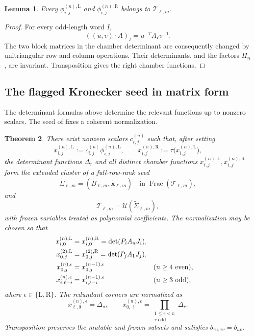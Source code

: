 \documentclass[11pt]{amsart}
\newtheorem{theorem}{Theorem}[section]
\newtheorem{lemma}[theorem]{Lemma}
\theoremstyle{definition}
\theoremstyle{remark}
\newcommand{\cT}{\mathcal T}
\newcommand{\Frac}{\operatorname{Frac}}
\begin{document}
\begin{lemma}
\label{lem:chamber-invariance}
Every $\phi_{i,j}^{(n),\mathrm L}$ and
$\phi_{i,j}^{(n),\mathrm R}$ belongs to $\cT_{\ell,m}$.
\end{lemma}

\begin{proof}
For every odd-length word $I$,
\[ ((u,v)\cdot A)_I=u^{-T}A_Iv^{-1}. \]
The two block matrices in the chamber determinant are consequently changed
by unitriangular row and column operations.  Their determinants, and the
factors $\Pi_n$, are invariant.  Transposition gives the right chamber
functions.
\end{proof}

\subsection{The flagged Kronecker seed in matrix form}
\label{subsec:flagged-matrix-form}

The determinant formulas above determine the relevant functions up to
nonzero scalars.  The seed of \cite{FeiKroneckerII} fixes a coherent
normalization.

\begin{theorem}\label{thm:flagged-matrix-form}
There exist nonzero scalars $c_{i,j}^{(n)}$ such that, after setting
\[ x_{i,j}^{(n),\mathrm L}:= c_{i,j}^{(n)}\phi_{i,j}^{(n),\mathrm L}, \qquad x_{i,j}^{(n),\mathrm R}:=\tau \bigl(x_{i,j}^{(n),\mathrm L}\bigr), \]
the determinant functions $\Delta_r$ and all distinct chamber functions
$x_{i,j}^{(n),\mathrm L},x_{i,j}^{(n),\mathrm R}$ form the extended cluster
of a full-row-rank seed
\[ \widetilde\Sigma_{\ell,m} =(\widetilde B_{\ell,m},\widetilde{\mathbf x}_{\ell,m}) \quad\text{in }\Frac(\cT_{\ell,m}), \]
and
\begin{equation}
 \cT_{\ell,m}=\mathcal U(\widetilde\Sigma_{\ell,m}),
 \label{eq:flagged-UCA}
\end{equation}
with frozen variables treated as polynomial coefficients.  The normalization
may be chosen so that
\begin{align}
 x_{i,0}^{(n),\mathrm L}&=x_{i,0}^{(n),\mathrm R}
 =\det(P_iA_nJ_i),
 \notag\\
 x_{0,j}^{(2),\mathrm L}&=x_{0,j}^{(2),\mathrm R}
 =\det(P_jA_1J_j),
 \notag\\
 x_{0,j}^{(n),\epsilon}&=x_{0,j}^{(n-1),\epsilon}
 &&(n\ge4\text{ even}),
 \label{eq:even-identification}\\
 x_{i,\ell-i}^{(n),\epsilon}
 &=x_{i,\ell-i}^{(n-1),\epsilon}
 &&(n\ge3\text{ odd}),
 \label{eq:odd-identification}
\end{align}
where $\epsilon\in\{\mathrm L,\mathrm R\}$.  The redundant corners are
normalized as
\[ x_{\ell,0}^{(n),\epsilon}=\Delta_n, \qquad x_{0,\ell}^{(n),\epsilon} =\prod_{\substack{1\le r<n\\r\text{ odd}}}\Delta_r. \]
Transposition preserves the mutable and frozen subsets and satisfies
$\widetilde b_{\tau u,\tau v}=\widetilde b_{uv}.$
\end{theorem}
\end{document}
